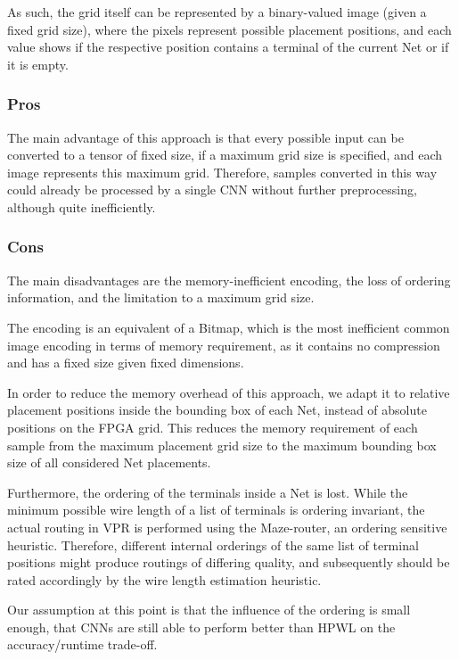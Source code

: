 As such, the grid itself can be represented by a binary-valued image (given a fixed grid size), where the pixels represent possible placement positions, and each value shows if the respective position contains a terminal of the current Net or if it is empty.

\subsubsection{Pros}

The main advantage of this approach is that every possible input can be converted to a tensor of fixed size, if a maximum grid size is specified, and each image represents this maximum grid. Therefore, samples converted in this way could already be processed by a single \gls{CNN} without further preprocessing, although quite inefficiently.

\subsubsection{Cons}

The main disadvantages are the memory-inefficient encoding, the loss of ordering information, and the limitation to a maximum grid size.

The encoding is an equivalent of a Bitmap, which is the most inefficient common image encoding in terms of memory requirement, as it contains no compression and has a fixed size given fixed dimensions.

In order to reduce the memory overhead of this approach, we adapt it to relative placement positions inside the bounding box of each Net, instead of absolute positions on the \gls{FPGA} grid. This reduces the memory requirement of each sample from the maximum placement grid size to the maximum bounding box size of all considered Net placements.

Furthermore, the ordering of the terminals inside a Net is lost. While the minimum possible wire length of a list of terminals is ordering invariant, the actual routing in \gls{VPR} is performed using the Maze-router, an ordering sensitive heuristic. Therefore, different internal orderings of the same list of terminal positions might produce routings of differing quality, and subsequently should be rated accordingly by the wire length estimation heuristic.

Our assumption at this point is that the influence of the ordering is small enough, that \glspl{CNN} are still able to perform better than \gls{HPWL} on the accuracy/runtime trade-off.

